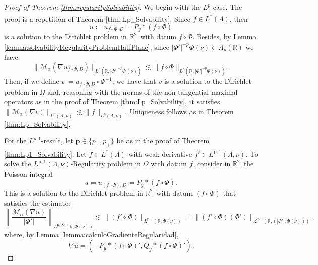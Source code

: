 \documentclass[12pt]{amsart}
\newcommand{\R}{\mathbb{R}}
\theoremstyle{plain}
\theoremstyle{definition}
\numberwithin{equation}{section}
\begin{document}
\begin{proof}[Proof of Theorem \ref{thm:regularitySolvability}]
    We begin with the $L^p$-case. The proof is a repetition of Theorem \ref{thm:Lp_Solvability}. Since $f\in \widetilde{L}^1(\Lambda)$, then 
    \[
    u
    \coloneqq 
    u_{f\circ \Phi,D}
    =
    P_y\ast (f\circ\Phi)
    \]
    is a solution to the Dirichlet problem in $\R_{+}^{2}$ with datum $f\circ\Phi$. Besides, by Lemma \ref{lemma:solvabilityRegularityProblemHalfPlane}, since $|\Phi'|^{-p}\Phi(\nu)\in A_p(\R)$ we have 
    \[
    \|\mathcal{M}_{\alpha}(\nabla u_{f\circ\Phi,D})\|_{L^p(\R,|\Phi'|^{-p}\Phi(\nu))}\lesssim \|f\circ\Phi\|_{L^p(\R,|\Phi'|^{-p}\Phi(\nu))}.
    \]
    Then, if we define $v\coloneqq u_{f\circ\Phi,D}\circ\Phi^{-1}$, we have that $v$ is a solution to the Dirichlet problem in $\Omega$ and, reasoning with the norms of the non-tangential maximal operators as in the proof of Theorem \ref{thm:Lp_Solvability}, it satisfies $\|\mathcal{M}_{\alpha}(\nabla v)\|_{L^p(\Lambda,\nu)}\lesssim \|f\|_{L^{p}(\Lambda,\nu)}$. Uniqueness follows as in Theorem \ref{thm:Lp_Solvability}.



    \vspace{0.3cm}



    For the $L^{p,1}$-result, let $\bm{p}\in \{p_{-},p_{+}\}$ be as in the proof of Theorem \ref{thm:Lp1_Solvability}. Let $f\in \widetilde{L}^1(\Lambda)$ with weak derivative $f'\in L^{\bm{p},1}(\Lambda,\nu)$. To solve the $L^{\bm{p},1}(\Lambda,\nu)$-Regularity problem in $\Omega$ with datum $f$, consider in $\R_{+}^{2}$ the Poisson integral 
    \[
    u
    =
    u_{(f\circ\Phi),D}
    =
    P_{y}\ast (f\circ\Phi).
    \]
    This is a solution to the Dirichlet problem in $\R_{+}^{2}$ with datum $(f\circ\Phi)$ that satisfies the estimate:
    \begin{equation}\label{eq:ntEstimateLp1Semiplano}
        \left\|\frac{\mathcal{M}_{\alpha}(\nabla u)}{|\Phi'|}\right\|_{L^{\bm{p},\infty}(\R,\Phi(\nu))}
        \lesssim
        \|(f'\circ\Phi)\|_{L^{\bm{p},1}(\R,\Phi(\nu))}
        =
        \|(f'\circ\Phi)(\Phi')\|_{\mathcal{L}^{\bm{p},1}(\R,(|\Phi'|,\Phi(\nu)))},
    \end{equation}
    where, by Lemma \ref{lemma:calculoGradienteRegularidad}, 
    \begin{equation}\label{eq:gradientLp1InProof}
    \nabla u
    =
    (-P_y\ast (f\circ\Phi)',Q_y\ast (f\circ\Phi)').    
    \end{equation}
    

\end{proof}
\end{document}
